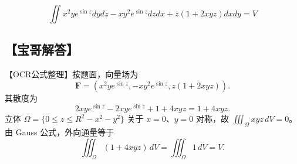 \documentclass[11pt,fontset=fandol]{ctexart}
\begin{document}
\[
\iint x ^ { 2 } y e ^ { \sin z } d y d z - x y ^ { 2 } e ^ { \sin z } d z d x + z ( 1 + 2 x y z ) d x d y = V
\]

\subsection{【宝哥解答】}\label{ux5b9dux54e5ux89e3ux7b54-3}

【OCR公式整理】按题面，向量场为 \[
\mathbf F=(x^2ye^{\sin z},-xy^2e^{\sin z},z(1+2xyz)).
\] 其散度为 \[
2xye^{\sin z}-2xye^{\sin z}+1+4xyz=1+4xyz.
\] 立体 \(\Omega=\{0\le z\le R^2-x^2-y^2\}\) 关于 \(x=0\)、\(y=0\)
对称，故 \(\iiint_\Omega xyz\,dV=0\)。由 Gauss 公式，外向通量等于 \[
\iiint_\Omega(1+4xyz)\,dV=\iiint_\Omega1\,dV=V.
\]
\end{document}
